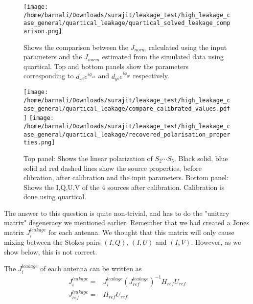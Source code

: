 \documentclass{article}
\begin{document}
\begin{figure}
\centering
\texttt{[image: /home/barnali/Downloads/surajit/leakage\_test/high\_leakage\_case\_general/quartical\_leakage/quartical\_solved\_leakage\_comparison.png]}
\caption{Shows the comparison between the $J_{norm}$ calculated using the input parameters and the $J_{norm}$ estimated from the simulated data using quartical. Top and bottom panels show the parameters corresponding to $d_{xi}e^{i\phi_{xi}}$ and $d_{yi}e^{i\phi_{yi}}$ respectively. }
\label{fig:nonlinear_quartical_leak_comparison_high_leak_general}
\end{figure} 

\begin{figure}
\centering
\texttt{[image: /home/barnali/Downloads/surajit/leakage\_test/high\_leakage\_case\_general/quartical\_leakage/compare\_calibrated\_values.pdf]}
\texttt{[image: /home/barnali/Downloads/surajit/leakage\_test/high\_leakage\_case\_general/quartical\_leakage/recovered\_polarisation\_properties.png]}
\caption{Top panel: Shows the linear polarization of $S_2\cdots S_5$. Black solid, blue solid ad red dashed lines show the source properties, before clibration, after calibration and the inpit parameters. Bottom panel: Shows the I,Q,U,V of the 4 sources after calibration. Calibration is done using quartical.}
\label{fig:compare_input_output_source_params_quartical_high_leak_general}
\end{figure}

The answer to this question is quite non-trivial, and has to do the "unitary matrix" degeneracy we mentioned earlier. Remember that we had created a Jones matrix $J^{leakage}_i$ for each antenna. We thought that this matrix will only cause mixing between the Stokes pairs $(I,Q)$, $(I,U)$ and $(I,V)$. However, as we show below, this is not correct.

The $J^{leakage}_{i}$ of each antenna can be written as
\begin{align}
J^{leakage}_i=& J^{leakage}_i \left ( J^{leakage}_{ref} \right )^{-1} H_{ref}U_{ref}\\
J^{leakage}_{ref}=& H_{ref}U_{ref}
\end{align}
\end{document}
